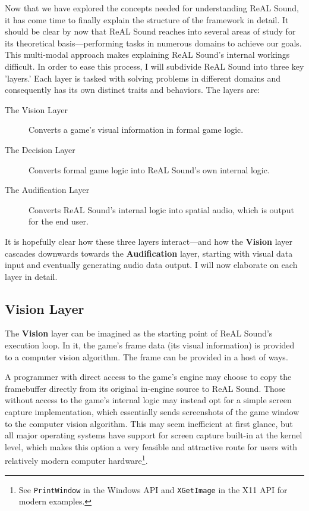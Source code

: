 \documentclass{report}
\newcommand{\rs}{ReAL Sound\xspace}
\newcommand{\vision}{\textbf{Vision}\xspace}
\newcommand{\audio}{\textbf{Audification}\xspace}
\begin{document}
Now that we have explored the concepts needed for understanding \rs, it has come time to finally explain the structure of the framework in detail. It should be clear by now that \rs reaches into several areas of study for its theoretical basis---performing tasks in numerous domains to achieve our goals. This multi-modal approach makes explaining \rs's internal workings difficult. In order to ease this process, I will subdivide \rs into three key 'layers.' Each layer is tasked with solving problems in different domains and consequently has its own distinct traits and behaviors. The layers are:

\begin{description}
    \item[The Vision Layer] Converts a game's visual information in formal game logic. 
    \item[The Decision Layer] Converts formal game logic into \rs's own internal logic.
    \item[The Audification Layer] Converts \rs's internal logic into spatial audio, which is output for the end user.
\end{description}

It is hopefully clear how these three layers interact---and how the \vision layer cascades downwards towards the \audio layer, starting with visual data input and eventually generating audio data output. I will now elaborate on each layer in detail. 

\subsection{Vision Layer}

The \vision layer can be imagined as the starting point of \rs's execution loop. In it, the game's frame data (its visual information) is provided to a computer vision algorithm. The frame can be provided in a host of ways. 

A programmer with direct access to the game's engine may choose to copy the framebuffer directly from its original in-engine source to \rs. Those without access to the game's internal logic may instead opt for a simple screen capture implementation, which essentially sends screenshots of the game window to the computer vision algorithm. This may seem inefficient at first glance, but all major operating systems have support for screen capture built-in at the kernel level, which makes this option a very feasible and attractive route for users with relatively modern computer hardware\footnote{See \texttt{PrintWindow} in the Windows API \cite{PrintWindow} and \texttt{XGetImage} in the X11 API \cite{XGetWindow} for modern examples.}. 
\end{document}
